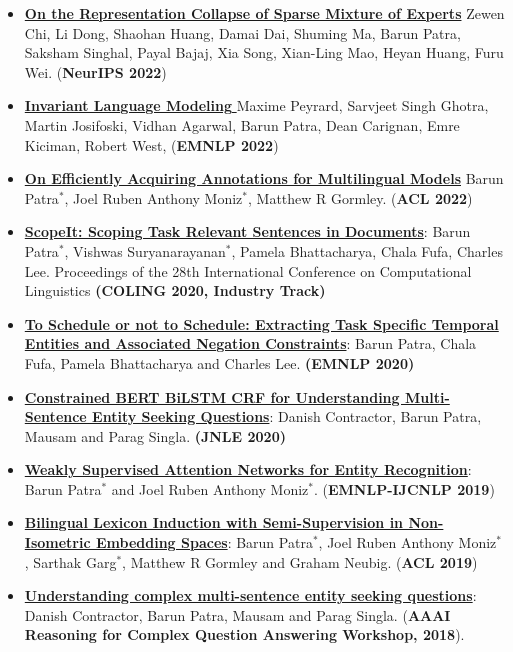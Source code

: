\documentclass[8pt,a4paper]{article}
\begin{document}
{\begin{itemize}[label={}]
    \item \href{https://arxiv.org/pdf/2204.09179.pdf}{\textbf{On the Representation Collapse of Sparse Mixture of Experts}} Zewen Chi, Li Dong, Shaohan Huang, Damai Dai, Shuming Ma, Barun Patra, Saksham Singhal, Payal Bajaj, Xia Song, Xian-Ling Mao, Heyan Huang, Furu Wei. (\textbf{NeurIPS 2022})
    \item \href{https://arxiv.org/pdf/2110.08413.pdf}{\textbf{Invariant Language Modeling }} Maxime Peyrard, Sarvjeet Singh Ghotra, Martin Josifoski, Vidhan Agarwal, Barun Patra, Dean Carignan, Emre Kiciman, Robert West, (\textbf{EMNLP 2022})
    \item \href{https://arxiv.org/abs/2204.01016}{\textbf{On Efficiently Acquiring Annotations for Multilingual Models}} Barun Patra$^{*}$, Joel Ruben Anthony Moniz$^{*}$, Matthew R Gormley. (\textbf{ACL 2022})
    \item \href{https://arxiv.org/pdf/2003.04988.pdf}{\textbf{ScopeIt: Scoping Task Relevant Sentences in Documents}}: Barun Patra$^{*}$, Vishwas Suryanarayanan$^{*}$, Pamela Bhattacharya, Chala Fufa, Charles Lee. Proceedings of the 28th International Conference on Computational Linguistics \textbf{(COLING 2020, Industry Track)}
    \item \href{https://www.aclweb.org/anthology/2020.emnlp-main.678.pdf}{\textbf{To Schedule or not to Schedule: Extracting Task Specific Temporal Entities and Associated Negation Constraints}}: Barun Patra, Chala Fufa, Pamela Bhattacharya and Charles Lee. \textbf{(EMNLP 2020)}
    \item \href{https://www.cambridge.org/core/journals/natural-language-engineering/article/constrained-bert-bilstm-crf-for-understanding-multisentence-entityseeking-questions/891F2A9DAD6642A17D8B67523EC45316}{\textbf{Constrained BERT BiLSTM CRF for Understanding Multi-Sentence Entity Seeking Questions}}: Danish Contractor, Barun Patra, Mausam and Parag Singla. \textbf{(JNLE 2020)}
    \item \href{https://www.aclweb.org/anthology/D19-1652.pdf}{\textbf{Weakly Supervised Attention Networks for Entity Recognition}}: Barun Patra$^{*}$ and Joel Ruben Anthony Moniz$^{*}$. (\textbf{EMNLP-IJCNLP 2019})
    \item \href{https://www.aclweb.org/anthology/P19-1018.pdf}{\textbf{Bilingual Lexicon Induction with Semi-Supervision in Non-Isometric Embedding Spaces}}: Barun Patra$^{*}$, Joel Ruben Anthony Moniz$^{*}$, Sarthak Garg$^{*}$, Matthew R Gormley and Graham Neubig. (\textbf{ACL 2019})
    \item \href{https://pdfs.semanticscholar.org/90aa/b652eed53d7a5b8284c173b1aac698a43e4c.pdf}{\textbf{Understanding complex multi-sentence entity seeking questions}}: Danish Contractor, Barun Patra, Mausam and Parag Singla. (\textbf{AAAI Reasoning for Complex Question Answering Workshop, 2018}).

\end{itemize}}
\end{document}
